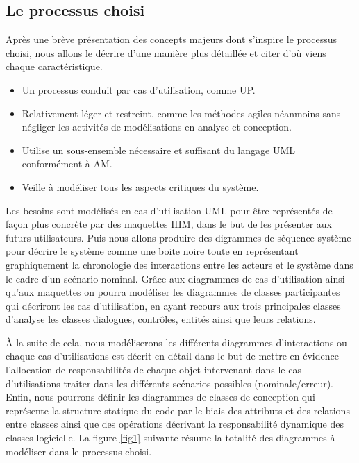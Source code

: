     \subsection{Le processus choisi }
        Après une brève présentation des concepts majeurs dont s’inspire le processus choisi, nous allons le décrire d’une manière plus détaillée et citer d’où viens chaque caractéristique.
        \begin{itemize}
        
            \item [\textbullet] Un processus conduit par cas d’utilisation, comme UP.
            \item [\textbullet] Relativement léger et restreint, comme les méthodes agiles néanmoins sans négliger les activités de modélisations en analyse et conception.
            \item [\textbullet] Utilise un sous-ensemble nécessaire et suffisant du langage UML conformément à AM.
            \item [\textbullet] Veille à modéliser tous les aspects critiques du système.
            
        \end{itemize}
        Les besoins sont modélisés en cas d’utilisation UML pour être représentés de façon plus concrète par des maquettes IHM, dans le but de les présenter aux futurs utilisateurs. Puis nous allons produire des digrammes de séquence système pour décrire le système comme une boite noire toute en représentant graphiquement la chronologie des interactions entre les acteurs et le système dans le cadre d’un scénario nominal. Grâce aux diagrammes de cas d’utilisation ainsi qu’aux maquettes on pourra modéliser les diagrammes de classes participantes qui décriront les cas d’utilisation, en ayant recours aux trois principales classes d’analyse les classes dialogues, contrôles, entités ainsi que leurs relations.

        À la suite de cela, nous modéliserons les différents diagrammes d’interactions ou chaque cas d’utilisations est décrit en détail dans le but de mettre en évidence l’allocation de responsabilités de chaque objet intervenant dans le cas d’utilisations traiter dans les différents scénarios possibles (nominale/erreur). Enfin, nous pourrons définir les diagrammes de classes de conception qui représente la structure statique du code par le biais des attributs et des relations entre classes ainsi que des opérations décrivant la responsabilité dynamique des classes logicielle.
        La figure \ref{fig1} suivante résume la totalité des diagrammes à modéliser dans le processus choisi.
        
